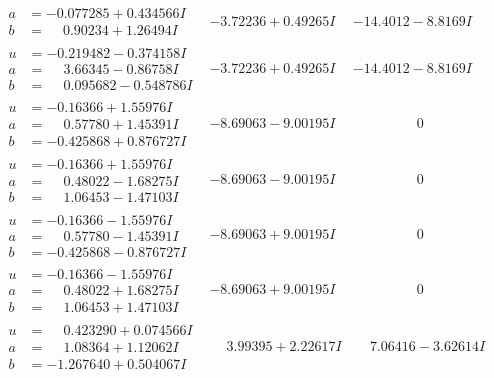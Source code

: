 \documentclass[1p]{elsarticle_modified}
\theoremstyle{definition}
\begin{document}
$$\begin{array}{c|c|c}
\begin{aligned}
a &= -0.077285 + 0.434566 I \\
b &= \phantom{-}0.90234 + 1.26494 I\end{aligned}
 & -3.72236 + 0.49265 I & -14.4012 - 8.8169 I \\ \hline\begin{aligned}
u &= -0.219482 - 0.374158 I \\
a &= \phantom{-}3.66345 - 0.86758 I \\
b &= \phantom{-}0.095682 - 0.548786 I\end{aligned}
 & -3.72236 + 0.49265 I & -14.4012 - 8.8169 I \\ \hline\begin{aligned}
u &= -0.16366 + 1.55976 I \\
a &= \phantom{-}0.57780 + 1.45391 I \\
b &= -0.425868 + 0.876727 I\end{aligned}
 & -8.69063 - 9.00195 I & \phantom{-0.000000 } 0 \\ \hline\begin{aligned}
u &= -0.16366 + 1.55976 I \\
a &= \phantom{-}0.48022 - 1.68275 I \\
b &= \phantom{-}1.06453 - 1.47103 I\end{aligned}
 & -8.69063 - 9.00195 I & \phantom{-0.000000 } 0 \\ \hline\begin{aligned}
u &= -0.16366 - 1.55976 I \\
a &= \phantom{-}0.57780 - 1.45391 I \\
b &= -0.425868 - 0.876727 I\end{aligned}
 & -8.69063 + 9.00195 I & \phantom{-0.000000 } 0 \\ \hline\begin{aligned}
u &= -0.16366 - 1.55976 I \\
a &= \phantom{-}0.48022 + 1.68275 I \\
b &= \phantom{-}1.06453 + 1.47103 I\end{aligned}
 & -8.69063 + 9.00195 I & \phantom{-0.000000 } 0 \\ \hline\begin{aligned}
u &= \phantom{-}0.423290 + 0.074566 I \\
a &= \phantom{-}1.08364 + 1.12062 I \\
b &= -1.267640 + 0.504067 I\end{aligned}
 & \phantom{-}3.99395 + 2.22617 I & \phantom{-}7.06416 - 3.62614 I \\ \hline\begin{aligned}

\end{aligned}
\end{array}$$
\end{document}
